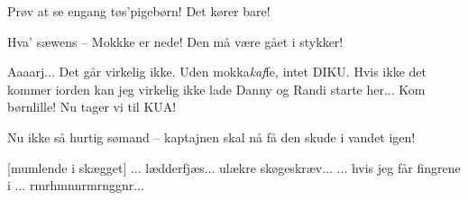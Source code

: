 \documentclass[a4paper,11pt]{article}
\begin{document}
\begin{sketch}
 Prøv at se engang tøs'pigebørn! Det kører bare! 

 Hva' sæwens -- Mokkke er nede! Den må være gået i stykker!

 Aaaarj...  Det går virkelig ikke. Uden mokka\emph{kaf}fe, intet
DIKU. Hvis ikke det kommer iorden kan jeg virkelig ikke lade Danny og Randi
starte her...  Kom børnlille! Nu tager vi til KUA! 

 Nu ikke så hurtig sømand -- kaptajnen skal nå få den skude i
vandet igen!


 [mumlende i skægget] ... lædderfjæs... ulækre
skøgeskræv...  ... hvis jeg
får fingrene i ... rmrhmnnrmrnggnr...










\end{sketch}
\end{document}
